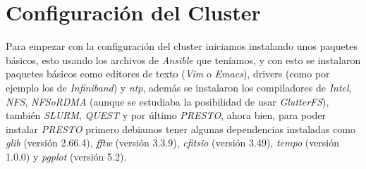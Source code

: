 \section{Configuración del Cluster}

Para empezar con la configuración del cluster iniciamos instalando unos paquetes básicos, esto
usando los archivos de \emph{Ansible} que teníamos, y con esto se instalaron paquetes básicos como
editores de texto (\emph{Vim} o \emph{Emacs}), drivers (como por ejemplo los de \emph{Infiniband}) y 
\emph{ntp}, además se instalaron los compiladores de \emph{Intel}, \emph{NFS}, \emph{NFSoRDMA}
(aunque se estudiaba la posibilidad de usar \emph{GlutterFS}), también \emph{SLURM}, \emph{QUEST} y 
por último \emph{PRESTO}, ahora bien, para poder instalar \emph{PRESTO} primero debiamos tener
algunas dependencias instaladas como \emph{glib} (versión 2.66.4), \emph{fftw} (versión 3.3.9), 
\emph{cfitsio} (versión 3.49), \emph{tempo} (versión 1.0.0) y \emph{pgplot} (versión 5.2).